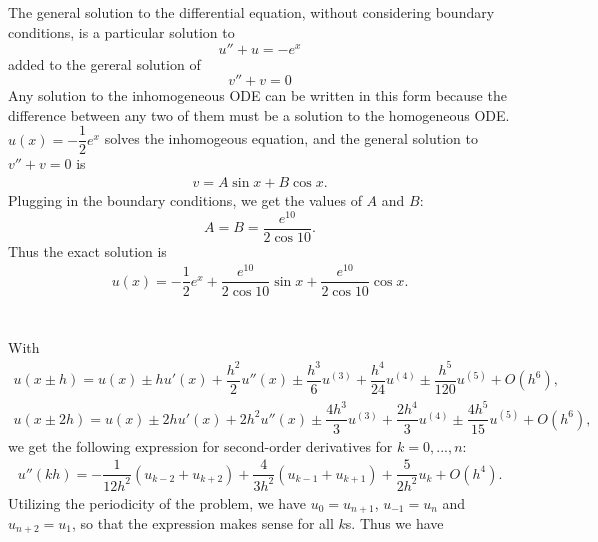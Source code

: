 \documentclass[11pt]{article}
\begin{document}
\subsection{}
The general solution to the differential equation, without considering boundary conditions, is a particular solution to 
\begin{equation}
u''+u=-e^x
\end{equation} 
added to the gereral solution of 
\begin{equation}
v''+v = 0
\end{equation} 
Any solution to the inhomogeneous ODE can be written in this form because the difference between any two of them must be a solution to the homogeneous ODE. $u(x)=-\dfrac12e^x$ solves the inhomogeous equation, and the general solution to $v''+v=0$ is 
\begin{equation}\begin{split}
v = A\sin x + B\cos x.
\end{split}\nonumber\end{equation} 
Plugging in the boundary conditions, we get the values of $A$ and $B$:
$$A =B=\dfrac{e^{10}}{2\cos 10}.$$
Thus the exact solution is 
\begin{equation}\begin{split}
u(x) = -\dfrac12e^x+\dfrac{e^{10}}{2\cos 10}\sin x +\dfrac{e^{10}}{2\cos 10}\cos x. 
\end{split}\end{equation} 

\pagebreak

\section{}
\subsection{}
With
\begin{equation}\begin{split}
u(x\pm h) = u(x) \pm hu'(x) + \dfrac{h^2}2u''(x) \pm\dfrac{h^3}6 u^{(3)}+\dfrac{h^4}{24}u^{(4)}\pm\dfrac{h^5}{120}u^{(5)}+O(h^6),\\
u(x\pm 2h) = u(x) \pm 2hu'(x) + {2h^2}u''(x) \pm\dfrac{4h^3}3 u^{(3)}+\dfrac{2h^4}{3}u^{(4)}\pm\dfrac{4h^5}{15}u^{(5)}+O(h^6),
\end{split}\end{equation} 
we get the following expression for second-order derivatives for $k=0,...,n$:
\begin{equation}\begin{split}
u''(kh) = -\dfrac1{12h^2}(u_{k-2}+u_{k+2}) + \dfrac4{3h^2}(u_{k-1}+u_{k+1})+\dfrac5{2h^2}u_k + O(h^4).
\end{split}\end{equation}
Utilizing the periodicity of the problem, we have $u_0 = u_{n+1}$, $u_{-1}=u_{n}$ and $u_{n+2} = u_1$, so that the expression makes sense for all $k$s. Thus we have
\end{document}
